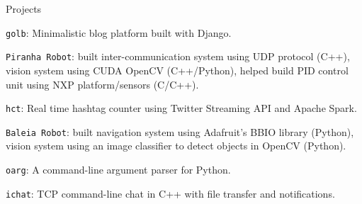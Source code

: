 \documentclass[8pt]{resume}
\newcommand{\ttt}[1]{\texttt{#1}}
\begin{document}
\begin{rSection}{Projects}

\begin{rSubsection}{}{}{}{}
    \item \ttt{golb}: Minimalistic blog platform built with Django.
    \item \ttt{Piranha Robot}:
        built inter-communication system using UDP protocol (C++),
        vision system using CUDA OpenCV (C++/Python),
        helped build PID control unit using NXP platform/sensors (C/C++).
    \item \ttt{hct}: Real time hashtag counter using Twitter Streaming API and
        Apache Spark.
    \item \ttt{Baleia Robot}:
        built navigation system using Adafruit's BBIO library (Python),
        vision system using an image classifier to detect objects in OpenCV (Python).
    \item \ttt{oarg}: A command-line argument parser for Python.
    \item \ttt{ichat}: TCP command-line chat in C++ with file transfer and
        notifications.
\end{rSubsection}

\end{rSection}
\end{document}

